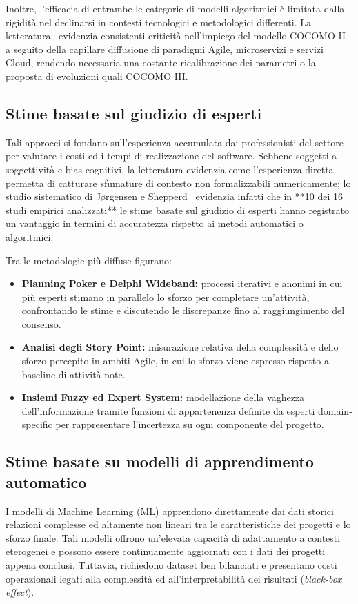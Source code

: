 \documentclass[11pt, a4paper]{article}
\begin{document}
Inoltre, l'efficacia di entrambe le categorie di modelli algoritmici è limitata dalla rigidità nel declinarsi in contesti tecnologici e metodologici differenti. La letteratura~\cite{DBLP:journals/corr/MenziesYMBH16} evidenzia consistenti criticità nell'impiego del modello COCOMO II a seguito della capillare diffusione di paradigmi Agile, microservizi e servizi Cloud, rendendo necessaria una costante ricalibrazione dei parametri o la proposta di evoluzioni quali COCOMO III.

\subsection{Stime basate sul giudizio di esperti}
Tali approcci si fondano sull'esperienza accumulata dai professionisti del settore per valutare i costi ed i tempi di realizzazione del software. Sebbene soggetti a soggettività e bias cognitivi, la letteratura evidenzia come l'esperienza diretta permetta di catturare sfumature di contesto non formalizzabili numericamente; lo studio sistematico di Jørgensen e Shepperd~\cite{4027147} evidenzia infatti che in **10 dei 16 studi empirici analizzati** le stime basate sul giudizio di esperti hanno registrato un vantaggio in termini di accuratezza rispetto ai metodi automatici o algoritmici.

Tra le metodologie più diffuse figurano:
\begin{itemize}
    \item \textbf{Planning Poker e Delphi Wideband:} processi iterativi e anonimi in cui più esperti stimano in parallelo lo sforzo per completare un'attività, confrontando le stime e discutendo le discrepanze fino al raggiungimento del consenso.
    \item \textbf{Analisi degli Story Point:} misurazione relativa della complessità e dello sforzo percepito in ambiti Agile, in cui lo sforzo viene espresso rispetto a baseline di attività note.
    \item \textbf{Insiemi Fuzzy ed Expert System:} modellazione della vaghezza dell'informazione tramite funzioni di appartenenza definite da esperti domain-specific per rappresentare l'incertezza su ogni componente del progetto.
\end{itemize}

\subsection{Stime basate su modelli di apprendimento automatico}
I modelli di Machine Learning (ML) apprendono direttamente dai dati storici relazioni complesse ed altamente non lineari tra le caratteristiche dei progetti e lo sforzo finale. Tali modelli offrono un'elevata capacità di adattamento a contesti eterogenei e possono essere continuamente aggiornati con i dati dei progetti appena conclusi. Tuttavia, richiedono dataset ben bilanciati e presentano costi operazionali legati alla complessità ed all'interpretabilità dei risultati (\textit{black-box effect}).
\end{document}
